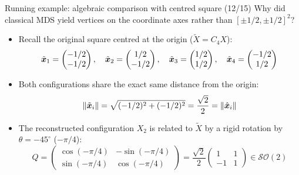 \documentclass[aspectratio=169]{beamer}\usepackage[]{graphicx}\usepackage[]{xcolor}
\begin{document}
\begin{frame}{Running example: algebraic comparison with centred square (12/15)}
Why did classical MDS yield vertices on the coordinate axes rather than $[\pm 1/2, \pm 1/2]^2$?
\vfill
\begin{itemize}
\item Recall the original square centred at the origin ($\widetilde{X} = C_4 X$):
\[
\tilde{\bm{x}}_1 = \begin{pmatrix} -1/2 \\ -1/2 \end{pmatrix}, \quad
\tilde{\bm{x}}_2 = \begin{pmatrix} 1/2 \\ -1/2 \end{pmatrix}, \quad
\tilde{\bm{x}}_3 = \begin{pmatrix} 1/2 \\ 1/2 \end{pmatrix}, \quad
\tilde{\bm{x}}_4 = \begin{pmatrix} -1/2 \\ 1/2 \end{pmatrix}
\]
\vfill
\item Both configurations share the exact same distance from the origin:
\[
\|\tilde{\bm{x}}_i\| = \sqrt{(-1/2)^2 + (-1/2)^2} = \frac{\sqrt{2}}{2} = \|\hat{\bm{x}}_i\|
\]
\vfill
\item The reconstructed configuration $X_2$ is related to $\widetilde{X}$ by a rigid rotation by $\theta = -45^\circ$ ($-\pi/4$):
\[
Q = \begin{pmatrix} \cos(-\pi/4) & -\sin(-\pi/4) \\ \sin(-\pi/4) & \cos(-\pi/4) \end{pmatrix} = \frac{\sqrt{2}}{2}\begin{pmatrix} 1 & 1 \\ -1 & 1 \end{pmatrix} \in \mathcal{SO}(2)
\]
\end{itemize}
\end{frame}
\end{document}
